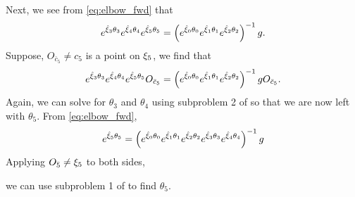 \begin{example}
	Next, we see from \eqref{eq:elbow_fwd} that 
	\begin{align}
		{e^{\hat{\xi}_{3} \theta_3} } {e^{\hat{\xi}_{4} \theta_4} } {e^{\hat{\xi}_{5} \theta_5} } = \left({e^{\hat{\xi}_{0} \theta_0} }{e^{\hat{\xi}_{1} \theta_1} }{e^{\hat{\xi}_{2} \theta_2} }\right)^{-1} g.
	\end{align}
	Suppose, $O_{\bar{c}_5} \neq c_5$ is a point on $\xi_5$, we find that 
	\begin{align}
	{e^{\hat{\xi}_{3} \theta_3} } {e^{\hat{\xi}_{4} \theta_4} } {e^{\hat{\xi}_{5} \theta_5} }O_{\bar{c}_5} = \left({e^{\hat{\xi}_{0} \theta_0} }{e^{\hat{\xi}_{1} \theta_1} }{e^{\hat{\xi}_{2} \theta_2} }\right)^{-1} g O_{\bar{c}_5}.
	\end{align}
	Again, we can solve for $\theta_3$ and $\theta_4$ using subproblem 2 of \cite[pp 100]{MurrayBook} so that we are now left with $\theta_5$.  From \eqref{eq:elbow_fwd}, 
	\begin{align}
		{e^{\hat{\xi}_{5} \theta_5} } = \left({e^{\hat{\xi}_{0} \theta_0} } {e^{\hat{\xi}_{1} \theta_1} } {e^{\hat{\xi}_{2} \theta_2} } {e^{\hat{\xi}_{3} \theta_3} } {e^{\hat{\xi}_{4} \theta_4} } \right)^{-1} g 
	\end{align}
	Applying $O_{\bar{5}} \neq \xi_5$ to both sides, 
\end{example}we can use subproblem 1 of \cite[pp. 99]{MurrayBook} to find $\theta_5$. 